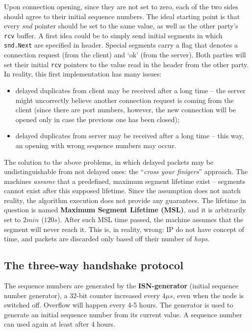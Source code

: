 \documentclass[10pt]{book}
\begin{document}
Upon connection opening, since they are not set to zero, each of the two sides
should agree to their initial sequence numbers. The ideal starting point is
that every \emph{snd} pointer should be set to the same value, as well as the
other party's \texttt{rcv} buffer. A first idea could be to simply send initial
segments in which \texttt{snd.Next} are specified in header. Special segments
carry a flag that denotes a connection request (from the client) and `ok' (from
the server). Both parties will set their initial \texttt{rcv} pointers to the
value read in the header from the other party. In reality, this first
implementation has many issues:
\begin{itemize}
    \item delayed duplicates from client may be received after a long time \---
        the server might uncorrectly believe another connection request is
        coming from the client (since there are port numbers, however, the new
        connection will be opened only in case the previous one has been
        closed);
    \item delayed duplicates from server may be received after a long time \---
        this way, an opening with wrong sequence numbers may occur.
\end{itemize}

The solution to the above problems, in which delayed packets may be
undistinguishable from not delayed ones: the ``\emph{cross your finigers}''
approach. The machines \emph{assume} that a predefined, maximum segment
lifetime exist \--- segments cannot exist after this supposed lifetime. Since
the assumption does not match reality, the algorithm execution does not provide
any guarantees. The lifetime in question is named \textbf{Maximum Segment
Lifetime (MSL)}, and it is arbitrarily set to $2 min$ ($120s$). After such MSL
time passed, the machine assumes that the segment will never reach it. This is,
in reality, wrong: IP do not have concept of time, and packets are discarded
only based off their number of \emph{hops}. 

\subsection{The three-way handshake protocol}

The sequence numbers are generated by the \textbf{ISN-generator} (initial
sequence number generator), a $32$-bit counter increased every $4\mu s$, even
when the node is switched off. Overflow will happen every 4-5 hours. The
generator is used to generate an initial sequence number from its current
value. A sequence number can used again at least after $4$ hours.
\end{document}
